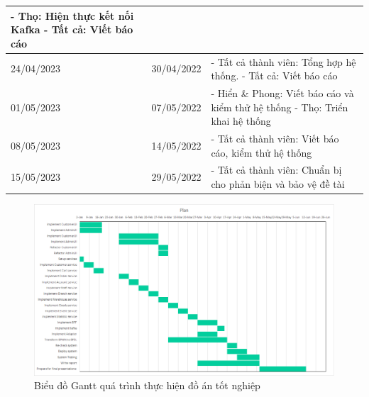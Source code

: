 {\begin{longtable}{| p{2cm} | p{2cm} | p{10cm} |}
    \newline
    - Thọ: Hiện thực kết nối Kafka
    \newline
    - Tất cả: Viết báo cáo                                                                           \\
    \hline
    24/04/2023       & 30/04/2022   &
    - Tất cả thành viên: Tổng hợp hệ thống.
    \newline
    - Tất cả: Viết báo cáo                                                                           \\
    \hline
    01/05/2023       & 07/05/2022   &
    - Hiển           \& Phong: Viết báo cáo và kiểm thử hệ thống
    \newline
    - Thọ: Triển khai hệ thống                                                                       \\
    \hline
    08/05/2023       & 14/05/2022   &
    - Tất cả thành viên: Viết báo cáo, kiểm thử hệ thống                                             \\
    \hline
    15/05/2023       & 29/05/2022   &
    - Tất cả thành viên: Chuẩn bị cho phản biện và bảo vệ đề tài                                     \\
    \hline
\end{longtable}

}

\newpage

\begin{figure}[h]
    \begin{center}
        \includegraphics[width=14cm]{img/plan.png}
    \end{center}
    \caption{Biểu đồ Gantt quá trình thực hiện đồ án tốt nghiệp}
\end{figure}


